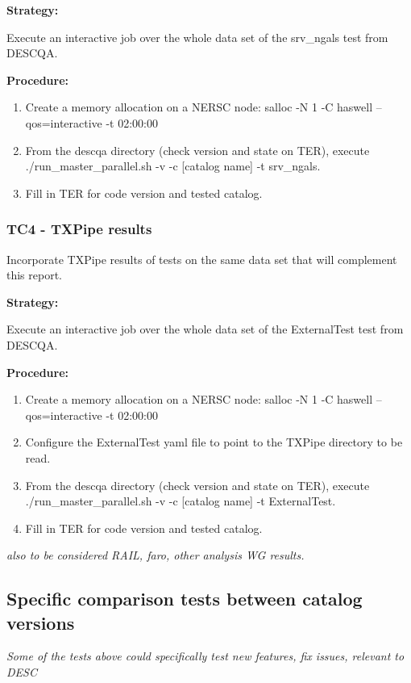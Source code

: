 \documentclass[12pt, a4paper]{article}
\begin{document}
\textbf{Strategy:} 

Execute an interactive job over the whole data set of the srv\_ngals test from DESCQA. 

\textbf{Procedure:} 

\begin{enumerate}
	\item Create a memory allocation on a NERSC node: salloc -N 1 -C haswell --qos=interactive -t 02:00:00
	\item From the descqa directory (check version and state on TER), execute ./run\_master\_parallel.sh -v -c [catalog name] -t srv\_ngals. 
	\item Fill in TER for code version and tested catalog.
\end{enumerate}

\subsubsection{TC4 - TXPipe results}
Incorporate TXPipe results of tests on the same data set that will complement this report.

\textbf{Strategy:} 

Execute an interactive job over the whole data set of the ExternalTest test from DESCQA. 

\textbf{Procedure:} 

\begin{enumerate}
	\item Create a memory allocation on a NERSC node: salloc -N 1 -C haswell --qos=interactive -t 02:00:00
	\item Configure the ExternalTest yaml file to point to the TXPipe directory to be read.
	\item From the descqa directory (check version and state on TER), execute ./run\_master\_parallel.sh -v -c [catalog name] -t ExternalTest. 
	\item Fill in TER for code version and tested catalog.
\end{enumerate}

\textit{also to be considered RAIL, faro, other analysis WG results.}

\subsection{Specific comparison tests between catalog versions}

\textit{Some of the tests above could specifically test new features, fix issues, relevant to DESC}
\end{document}
